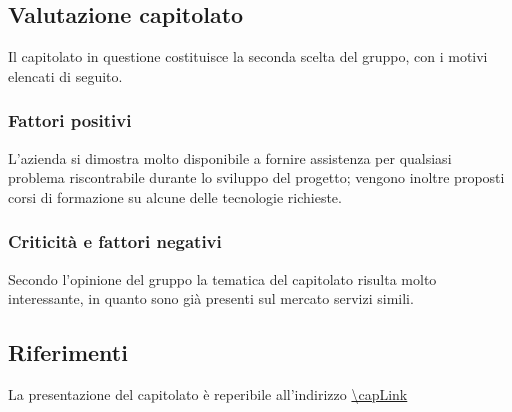\subsection{Valutazione capitolato}
Il capitolato in questione costituisce la seconda scelta del gruppo, con i motivi elencati di seguito.

\subsubsection{Fattori positivi}

L'azienda si dimostra molto disponibile a fornire assistenza per qualsiasi problema riscontrabile durante lo sviluppo del progetto; vengono inoltre proposti corsi di formazione su alcune delle tecnologie richieste.

\subsubsection{Criticità e fattori negativi}

Secondo l'opinione del gruppo la tematica del capitolato risulta molto interessante, in quanto sono già presenti sul mercato servizi simili.

\subsection{Riferimenti}
La presentazione del capitolato è reperibile all'indirizzo \url{\capLink}
